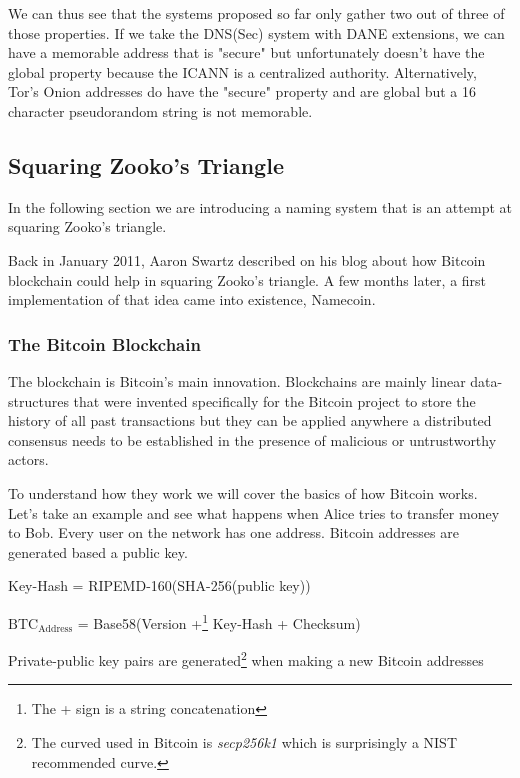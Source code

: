 \documentclass{vldb}
\begin{document}
We can thus see that the systems proposed so far only gather two out of three of those properties. If we take the DNS(Sec) system with DANE extensions, we can have a memorable address that is "secure" but unfortunately doesn't have the global property because the ICANN is a centralized authority. Alternatively, Tor's Onion addresses do have the "secure" property and are global but a 16 character pseudorandom string is not memorable.

\subsection{Squaring Zooko's Triangle}

In the following section we are introducing a naming system that is an attempt at squaring Zooko's triangle.

Back in January 2011, Aaron Swartz described on his blog\cite{aaronBlog} about how Bitcoin blockchain could help in squaring Zooko's triangle. A few months later, a first implementation of that idea came into existence, Namecoin.

\subsubsection{The Bitcoin Blockchain}

The blockchain is Bitcoin's main innovation. Blockchains are mainly linear data-structures that were invented specifically for the Bitcoin project to store the history of all past transactions but they can be applied anywhere a distributed consensus needs to be established in the presence of malicious or untrustworthy actors.

To understand how they work we will cover the basics of how Bitcoin works. Let's take an example and see what happens when Alice tries to transfer money to Bob. Every user on the network has one address. Bitcoin addresses\cite{bitcoinSpec} are generated based a public key. 
\begin{center}

Key-Hash = RIPEMD-160(SHA-256(public key))

$\text{BTC}_{\text{Address}}$ = Base58(Version +\footnote{The + sign is a string concatenation} Key-Hash + Checksum)
\end{center}

Private-public key pairs are generated\footnote{The curved used in Bitcoin is \emph{secp256k1} which is surprisingly a NIST recommended curve.} when making a new Bitcoin addresses
\end{document}
